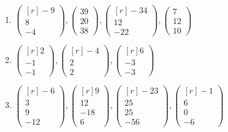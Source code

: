 \begin{enumerate}[resume]
    \item $\begin{pmatrix*}[r] -9 \\ 8 \\ -4 \end{pmatrix*}, \begin{pmatrix} 39 \\ 20 \\ 38 \end{pmatrix}, \begin{pmatrix*}[r] -34 \\ 12 \\ -22 \end{pmatrix*}, \begin{pmatrix} 7 \\ 12 \\ 10 \end{pmatrix}$\newpage
    \item $\begin{pmatrix*}[r] 2 \\ -1 \\ -1 \end{pmatrix*}, \begin{pmatrix*}[r] -4 \\ 2 \\ 2 \end{pmatrix*}, \begin{pmatrix*}[r] 6 \\ -3 \\ -3 \end{pmatrix*}$
    \item $\begin{pmatrix*}[r] -6 \\ 3 \\ 9 \\ -12 \end{pmatrix*}, \begin{pmatrix*}[r] 9 \\ 12 \\ -18 \\ 6 \end{pmatrix*}, \begin{pmatrix*}[r] -23 \\ 25 \\ 25 \\ -56 \end{pmatrix*}, \begin{pmatrix*}[r] -1 \\ 6 \\ 0 \\ -6 \end{pmatrix*}$

\end{enumerate}
